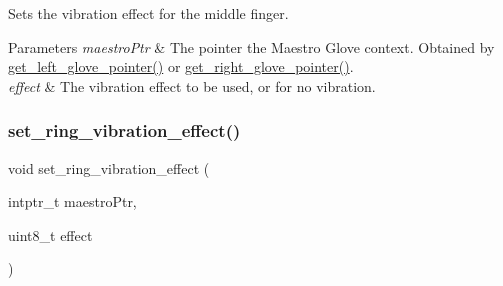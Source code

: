 Sets the vibration effect for the middle finger. 
\begin{DoxyParams}{Parameters}
{\em maestro\+Ptr} & The pointer the Maestro Glove context. Obtained by \hyperlink{group__glove_context_access_ga63ce3c99d4a8b8db851b22af9185764e}{get\+\_\+left\+\_\+glove\+\_\+pointer()} or \hyperlink{group__glove_context_access_ga9b8fd9d91aeac3f8da50f7a7eba0c32b}{get\+\_\+right\+\_\+glove\+\_\+pointer()}. \\
\hline
{\em effect} & The vibration effect to be used, or {} for no vibration. \\
\hline
\end{DoxyParams}
\mbox{\label{group__strong_ga8fbe7c8a6e2d9566023c31d0da891d74}} 
\subsubsection{\texorpdfstring{set\+\_\+ring\+\_\+vibration\+\_\+effect()}{set\_ring\_vibration\_effect()}}
{\footnotesize\ttfamily void set\+\_\+ring\+\_\+vibration\+\_\+effect (\begin{DoxyParamCaption}\item[{intptr\+\_\+t}]{maestro\+Ptr,  }\item[{uint8\+\_\+t}]{effect }\end{DoxyParamCaption})}

